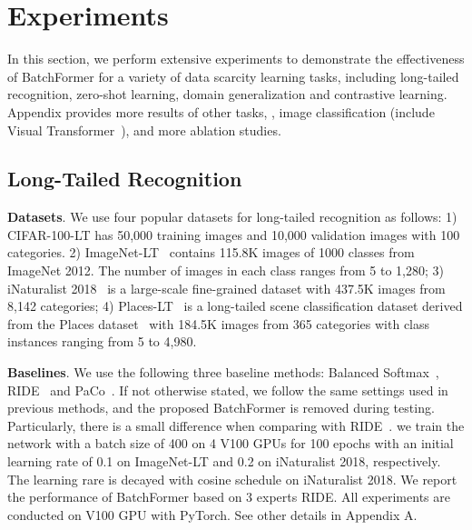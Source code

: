 \documentclass[10pt,twocolumn,letterpaper]{article}
\begin{document}
\section{Experiments}

In this section, we perform extensive experiments to demonstrate the effectiveness of BatchFormer for a variety of data scarcity learning tasks, including long-tailed recognition, zero-shot learning, domain generalization and contrastive learning. Appendix provides more results of other tasks, \eg, image classification (include Visual Transformer~\cite{touvron21adeit, dosovitskiy2020image}), and more ablation studies.



\subsection{Long-Tailed Recognition}



{\bf Datasets}. We use four popular datasets for long-tailed recognition as follows: 1) CIFAR-100-LT has 50,000 training images and 10,000 validation images with 100 categories.
2) ImageNet-LT~\cite{liu2019openlongtailrecognition} contains 115.8K images of 1000 classes from ImageNet 2012. The number of images in each class ranges from 5 to 1,280; 3) iNaturalist 2018~\cite{van2018inaturalist} is a large-scale fine-grained dataset with 437.5K images from 8,142 categories; 4) Places-LT~\cite{liu2019openlongtailrecognition} is a long-tailed scene classification dataset derived from the Places dataset~\cite{zhou2017places} with 184.5K images from 365 categories with class instances ranging from 5 to 4,980.

{\bf Baselines}.
We use the following three baseline methods: Balanced Softmax~\cite{ren2020balanced}, RIDE~\cite{wang2020long} and PaCo~\cite{cui2021parametric}. If not otherwise stated, we follow the same settings used in previous methods, and the proposed BatchFormer is removed during testing. Particularly, there is a small difference when comparing with RIDE~\cite{wang2020long}. we train the network with a batch size of 400 on 4 V100 GPUs for 100 epochs with an initial learning rate of 0.1 on ImageNet-LT and 0.2 on iNaturalist 2018, respectively. The learning rare is decayed with cosine schedule on iNaturalist 2018. We report the performance of BatchFormer based on 3 experts RIDE.
All experiments are conducted on V100 GPU with PyTorch. See other details in Appendix A.
\end{document}
